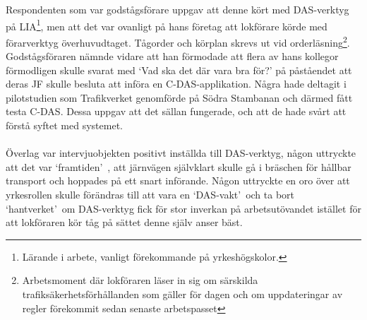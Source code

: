 Respondenten som var godstågsförare uppgav att denne kört med DAS-verktyg på LIA\footnote{Lärande i arbete, vanligt förekommande på yrkeshögskolor.}, men att det var ovanligt på hans företag att lokförare körde med förarverktyg överhuvudtaget.
Tågorder och körplan skrevs ut vid orderläsning\footnote{Arbetsmoment där lokföraren läser in sig om särskilda trafiksäkerhetsförhållanden som gäller för dagen och om uppdateringar av regler förekommit sedan senaste arbetspasset}.
Godstågsföraren nämnde vidare att han förmodade att flera av hans kollegor förmodligen skulle svarat med \lq{}Vad ska det där vara bra för?\rq{} på påståendet att deras JF skulle besluta att införa en C-DAS-applikation.
Några hade deltagit i pilotstudien som Trafikverket genomförde på Södra Stambanan och därmed fått testa C-DAS\@.
Dessa uppgav att det sällan fungerade, och att de hade svårt att förstå syftet med systemet.
\paragraph{}
\hspace{-11pt}
Överlag var intervjuobjekten positivt inställda till DAS-verktyg, någon uttryckte att det var \lq{}framtiden\rq{}~, att järnvägen självklart skulle gå i bräschen för hållbar transport och hoppades på ett snart införande.
Någon uttryckte en oro över att yrkesrollen skulle förändras till att vara en \lq{}DAS-vakt\rq{}~och ta bort \lq{}hantverket\rq{}~om DAS-verktyg fick för stor inverkan på arbetsutövandet istället för att lokföraren kör tåg på sättet denne själv anser bäst.
